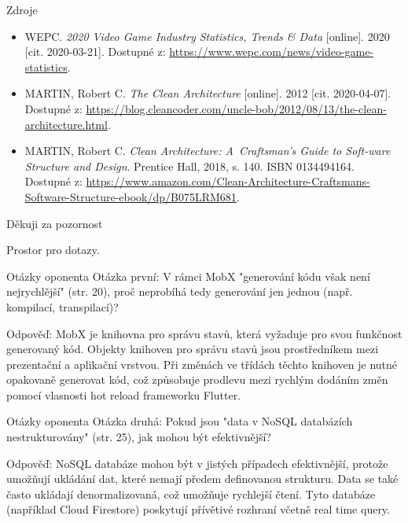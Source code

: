 \documentclass[czech,aspectratio=169]{beamer}
\begin{document}
  \begin{frame}{Zdroje}
    \begin{itemize}
      \item WEPC. \emph{2020 Video Game Industry Statistics, Trends \& Data} [online]. 2020 [cit. 2020-03-21]. Dostupné z: \url{https://www.wepc.com/news/video-game-statistics}.
      \item MARTIN, Robert C. \emph{The Clean Architecture} [online]. 2012 [cit. 2020-04-07]. Dostupné z: \url{https://blog.cleancoder.com/uncle-bob/2012/08/13/the-clean-architecture.html}.
      \item MARTIN, Robert C. \emph{Clean Architecture: A~Craftsman’s Guide to Soft-ware Structure and Design}. Prentice Hall, 2018, s. 140. ISBN 0134494164. Dostupné z: \url{https://www.amazon.com/Clean-Architecture-Craftsmans-Software-Structure-ebook/dp/B075LRM681}. 
    \end{itemize}
  \end{frame}

  \begin{frame}{Děkuji za pozornost}
    \begin{center}
      Prostor pro dotazy.
    \end{center}
  \end{frame}

  \begin{frame}[noframenumbering]{Otázky oponenta}
    Otázka první:
    V rámci MobX "generování kódu však není nejrychlější" (str. 20),
    proč neprobíhá tedy generování jen jednou (např. kompilací, transpilací)?

    \vfill

    Odpověď: MobX je knihovna pro správu stavů,
    která vyžaduje pro svou funkčnost generovaný kód.
    Objekty knihoven pro správu stavů jsou prostředníkem mezi
    prezentační a aplikační vrstvou.
    Při změnách ve třídách těchto knihoven je nutné opakovaně generovat kód,
    což způsobuje prodlevu mezi rychlým dodáním změn pomocí
    vlasnosti hot reload frameworku Flutter.
  \end{frame}

  \begin{frame}[noframenumbering]{Otázky oponenta}
    Otázka druhá:
    Pokud jsou "data v NoSQL databázích nestrukturovány" (str. 25),
    jak mohou být efektivnější?

    \vfill

    Odpověď:
    NoSQL databáze mohou být v jistých případech efektivnější,
    protože umožňují ukládání dat,
    které nemají předem definovanou strukturu.
    Data se také často ukládají denormalizovaná,
    což umožňuje rychlejší čtení.
    Tyto databáze (například Cloud Firestore) poskytují přívětivé rozhraní
    včetně real time query.
  \end{frame}
\end{document}
